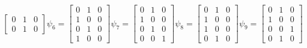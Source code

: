 \begin{align}
\begin{bmatrix}
0 & 1 & 0 \\
0 & 1 & 0
\end{bmatrix}
\psi_{6} =
\begin{bmatrix}
0 & 1 & 0 \\
1 & 0 & 0 \\
0 & 1 & 0 \\
1 & 0 & 0
\end{bmatrix}
\psi_{7} =
\begin{bmatrix}
0 & 1 & 0 \\
1 & 0 & 0 \\
0 & 1 & 0 \\
0 & 0 & 1
\end{bmatrix}
\psi_{8} =
\begin{bmatrix}
0 & 1 & 0 \\
1 & 0 & 0 \\
1 & 0 & 0 \\
0 & 1 & 0
\end{bmatrix}
\psi_{9} =
\begin{bmatrix}
0 & 1 & 0 \\
1 & 0 & 0 \\
0 & 0 & 1 \\
0 & 1 & 0
\end{bmatrix}
\end{align}


